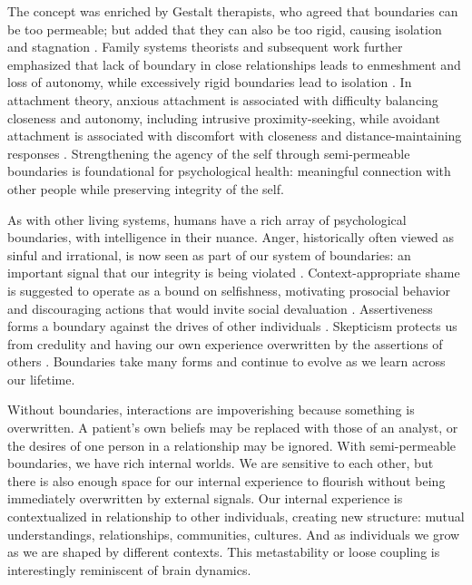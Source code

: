 \documentclass[12pt]{article}
\begin{document}
The concept was enriched by Gestalt therapists, who agreed that boundaries can be too permeable; but added that they can also be too rigid, causing isolation and stagnation \citep{perls1951gestalt, polster1974gestalt, yontef1993awareness}. Family systems theorists and subsequent work further emphasized that lack of boundary in close relationships leads to enmeshment and loss of autonomy, while excessively rigid boundaries lead to isolation \citep{minuchin1974families, bowen1978family, cloud1992boundaries, brown2012daring}. In attachment theory, anxious attachment is associated with difficulty balancing closeness and autonomy, including intrusive proximity-seeking, while avoidant attachment is associated with discomfort with closeness and distance-maintaining responses \citep{ainsworth1978patterns, mikulincer2007attachment, lavy2010autonomy}. Strengthening the agency of the self through semi-permeable boundaries is foundational for psychological health: meaningful connection with other people while preserving integrity of the self. 

As with other living systems, humans have a rich array of psychological boundaries, with intelligence in their nuance. Anger, historically often viewed as sinful and irrational, is now seen as part of our system of boundaries: an important signal that our integrity is being violated \citep{lerner1985dance, videbeck2010psychiatric, sell2011recalibrational}. Context-appropriate shame is suggested to operate as a bound on selfishness, motivating prosocial behavior and discouraging actions that would invite social devaluation \citep{bradshaw1988healing, dehooge2008shame, sznycer2016shame}. Assertiveness forms a boundary against the drives of other individuals \citep{smith1985say}. Skepticism protects us from credulity and having our own experience overwritten by the assertions of others \citep{lewandowsky2012misinformation, sperber2010epistemic}. Boundaries take many forms and continue to evolve as we learn across our lifetime.


Without boundaries, interactions are impoverishing because something is overwritten. A patient's own beliefs may be replaced with those of an analyst, or the desires of one person in a relationship may be ignored. With semi-permeable boundaries, we have rich internal worlds. We are sensitive to each other, but there is also enough space for our internal experience to flourish without being immediately overwritten by external signals. Our internal experience is contextualized in relationship to other individuals, creating new structure: mutual understandings, relationships, communities, cultures. And as individuals we grow as we are shaped by different contexts. This metastability or loose coupling is interestingly reminiscent of brain dynamics.
\end{document}
